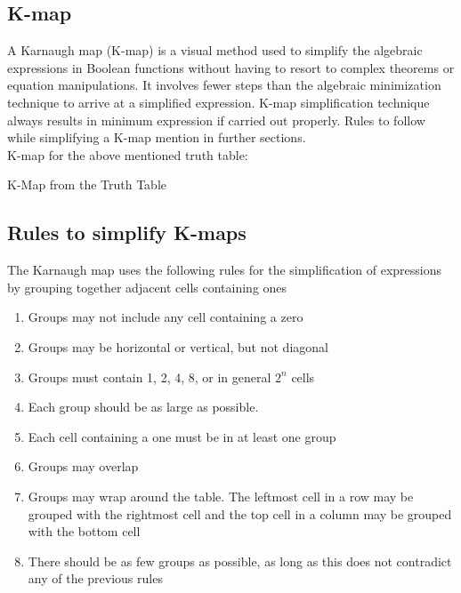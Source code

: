 \documentclass[journal,12pt,twocolumn]{IEEEtran}
\begin{document}
\subsection{K-map}
A Karnaugh map (K-map) is a visual method used to simplify the algebraic expressions in Boolean functions without having to resort to complex theorems or equation manipulations.  It involves fewer steps than the algebraic minimization technique to arrive at a simplified expression. K-map simplification technique always results in minimum expression if carried out properly. Rules to follow while simplifying a K-map mention in further sections. \\ 
\newpage
K-map for the above mentioned truth table:
\begin{table}[h]
\centering
\begin{kvmap}
\end{kvmap}
\vspace{4pt}
\caption{K-Map from the Truth Table}
    \label{kmap}
\end{table}
\subsection{Rules to simplify K-maps}
The Karnaugh map uses the following rules for the simplification of expressions by grouping together adjacent cells containing ones
\vspace{4pt}
\begin{enumerate}[itemsep=5pt]
    \item Groups may not include any cell containing a zero
    \item Groups may be horizontal or vertical, but not diagonal
    \item Groups must contain 1, 2, 4, 8, or in general $2^n$ cells
    \item Each group should be as large as possible.
    \item Each cell containing a one must be in at least one group
    \item Groups may overlap
    \item Groups may wrap around the table. The leftmost cell in a row may be grouped with the rightmost cell and the top cell in a column may be grouped with the bottom cell 
    \item There should be as few groups as possible, as long as this does not contradict any of the previous rules
\end{enumerate}
\newpage
\end{document}
